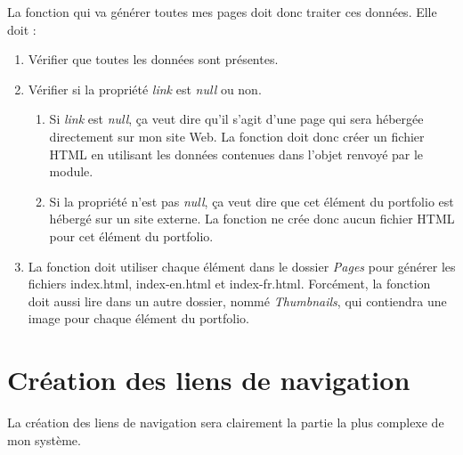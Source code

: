 La fonction qui va générer toutes mes pages doit donc traiter ces données. Elle doit :
\begin{enumerate}  
\item Vérifier que toutes les données sont présentes.
\item Vérifier si la propriété \textit{link} est \textit{null} ou non. 
\begin{enumerate} 
\item Si \textit{link} est \textit{null}, ça veut dire qu'il s'agit d'une page qui sera hébergée directement sur mon site Web. La fonction doit donc créer un fichier HTML en utilisant les données contenues dans l'objet renvoyé par le module.
\item Si la propriété n'est pas \textit{null}, ça veut dire que cet élément du portfolio est hébergé sur un site externe. La fonction ne crée donc aucun fichier HTML pour cet élément du portfolio.
\end{enumerate} 
\item La fonction doit utiliser chaque élément dans le dossier \textit{Pages} pour générer les fichiers index.html, index-en.html et index-fr.html. Forcément, la fonction doit aussi lire dans un autre dossier, nommé \textit{Thumbnails}, qui contiendra une image pour chaque élément du portfolio.

\end{enumerate}

\section{Création des liens de navigation}
La création des liens de navigation sera clairement la partie la plus complexe de mon système.